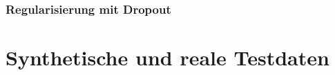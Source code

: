 \subsubsection{Regularisierung mit Dropout}




\section{Synthetische und reale Testdaten}
\label{ergebnis_synth_vs_real}


















